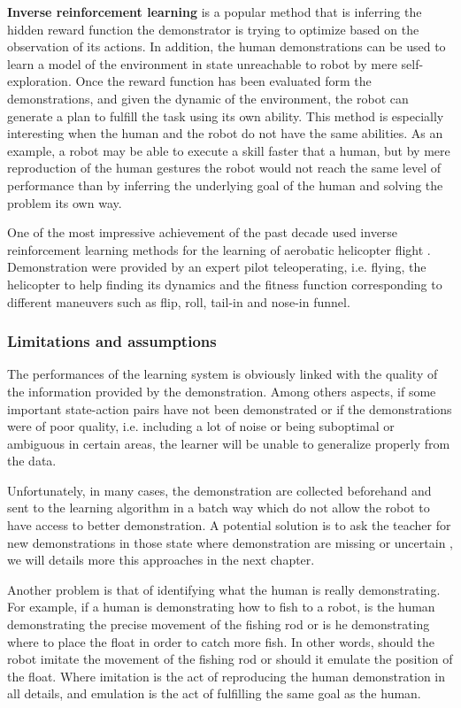 \textbf{Inverse reinforcement learning} \cite{ng2000algorithms,Abbeel04icml} is a popular method that is inferring the hidden reward function the demonstrator is trying to optimize based on the observation of its actions. In addition, the human demonstrations can be used to learn a model of the environment in state unreachable to robot by mere self-exploration. Once the reward function has been evaluated form the demonstrations, and given the dynamic of the environment, the robot can generate a plan to fulfill the task using its own ability. This method is especially interesting when the human and the robot do not have the same abilities. As an example, a robot may be able to execute a skill faster that a human, but by mere reproduction of the human gestures the robot would not reach the same level of performance than by inferring the underlying goal of the human and solving the problem its own way.

One of the most impressive achievement of the past decade used inverse reinforcement learning methods for the learning of aerobatic helicopter flight \cite{abbeel2007application}. Demonstration were provided by an expert pilot teleoperating, i.e. flying, the helicopter to help finding its dynamics and the fitness function corresponding to different maneuvers such as flip, roll, tail-in and nose-in funnel.

\subsubsection*{Limitations and assumptions}

The performances of the learning system is obviously linked with the quality of the information provided by the demonstration. Among others aspects, if some important state-action pairs have not been demonstrated or if the demonstrations were of poor quality, i.e. including a lot of noise or being suboptimal or ambiguous in certain areas, the learner will be unable to generalize properly from the data. 

Unfortunately, in many cases, the demonstration are collected beforehand and sent to the learning algorithm in a batch way which do not allow the robot to have access to better demonstration. A potential solution is to ask the teacher for new demonstrations in those state where demonstration are missing or uncertain \cite{chernova2008multi,chernova09jair}, we will details more this approaches in the next chapter.

Another problem is that of identifying what the human is really demonstrating. For example, if a human is demonstrating how to fish to a robot, is the human demonstrating the precise movement of the fishing rod or is he demonstrating where to place the float in order to catch more fish. In other words, should the robot imitate the movement of the fishing rod or should it emulate the position of the float. Where imitation is the act of reproducing the human demonstration in all details, and emulation is the act of fulfilling the same goal as the human.

